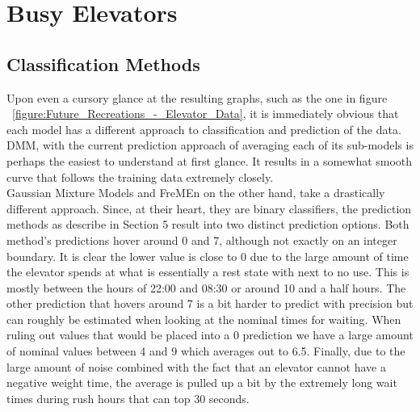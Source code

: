\section{ Busy Elevators }

\subsection{ Classification Methods }

Upon even a cursory glance at the resulting graphs, such as the one in figure
~\ref{figure:Future_Recreations_-_Elevator_Data}, it is immediately
obvious that each model has a different approach to classification and
prediction of the data. DMM, with the current prediction approach of
averaging each of its sub-models is perhaps the easiest to understand at first
glance. It results in a somewhat smooth curve that follows the training data
extremely closely. \\

Gaussian Mixture Models and FreMEn on the other hand, take a drastically
different approach.  Since, at their heart, they are binary classifiers, the
prediction methods as describe in Section 5 result into two distinct
prediction options. Both method's predictions hover around 0 and 7, although
not exactly on an integer boundary. It is clear the lower value is close to 0
due to the large amount of time the elevator spends at what is essentially a
rest state with next to no use. This is mostly between the hours of 22:00 and
08:30 or around 10 and a half hours. The other prediction that hovers around 7
is a bit harder to predict with precision but can roughly be estimated when
looking at the nominal times for waiting. When ruling out values that would be
placed into a 0 prediction we have a large amount of nominal values between 4
and 9 which averages out to 6.5. Finally, due to the large amount of noise
combined with the fact that an elevator cannot have a negative weight time,
the average is pulled up a bit by the extremely long wait times during rush
hours that can top 30 seconds.

